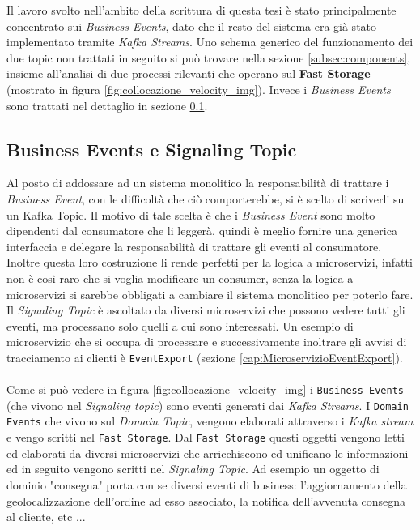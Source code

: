 Il lavoro svolto nell'ambito della scrittura di questa tesi è stato principalmente concentrato sui \textit{Business Events}, 
dato che il resto del sistema era già stato implementato tramite \textit{Kafka Streams}.
Uno schema generico del funzionamento dei due topic non trattati in seguito si può trovare nella sezione \ref{subsec:components}, insieme all'analisi di due processi
rilevanti che operano sul \textbf{Fast Storage} (mostrato in figura \ref{fig:collocazione_velocity_img}).
Invece i \textit{Business Events} sono trattati nel dettaglio in sezione \ref{subsec:business_events}.

\subsection{Business Events e Signaling Topic}
\label{subsec:business_events}
Al posto di addossare ad un sistema monolitico la responsabilità di trattare i \textit{Business Event}, con le difficoltà che ciò comporterebbe,
si è scelto di scriverli su un Kafka Topic. 
Il motivo di tale scelta è che i \textit{Business Event} sono molto dipendenti dal consumatore che li leggerà, quindi è meglio fornire una generica interfaccia
e delegare la responsabilità di trattare gli eventi al consumatore.
Inoltre questa loro costruzione li rende perfetti per la logica a microservizi, infatti non è così raro che si voglia modificare un consumer, senza la logica a microservizi
si sarebbe obbligati a cambiare il sistema monolitico per poterlo fare.
Il \textit{Signaling Topic} è ascoltato da diversi microservizi che possono vedere tutti gli eventi, ma processano solo quelli a cui sono interessati.
Un esempio di microservizio che si occupa di processare e successivamente inoltrare gli avvisi di tracciamento ai clienti è \texttt{EventExport} (sezione \ref{cap:MicroservizioEventExport}).
\\\\
Come si può vedere in figura \ref{fig:collocazione_velocity_img} i \texttt{Business Events} (che vivono nel \textit{Signaling topic}) sono eventi generati dai \textit{Kafka Streams}.
I \texttt{Domain Events} che vivono sul \textit{Domain Topic}, vengono elaborati attraverso i \textit{Kafka stream} e vengo scritti nel \texttt{Fast Storage}.
Dal \texttt{Fast Storage} questi oggetti vengono letti ed elaborati da diversi microservizi che arricchiscono ed unificano le informazioni ed in seguito vengono scritti nel \textit{Signaling Topic}.
Ad esempio un oggetto di dominio "consegna" porta con se diversi eventi di business: l'aggiornamento della geolocalizzazione dell'ordine ad esso associato, la notifica dell'avvenuta consegna al cliente, etc ...\\
